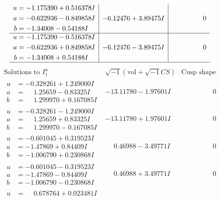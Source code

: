 \documentclass[1p]{elsarticle_modified}
\theoremstyle{definition}
\newcommand{\I}{\sqrt{-1}}
\begin{document}
$$\begin{array}{c|c|c}
\begin{aligned}
u &= -1.175390 + 0.516378 I \\
a &= -0.622936 - 0.849858 I \\
b &= -1.34008 - 0.54188 I\end{aligned}
 & -6.12476 + 3.89475 I & \phantom{-0.000000 } 0 \\ \hline\begin{aligned}
u &= -1.175390 - 0.516378 I \\
a &= -0.622936 + 0.849858 I \\
b &= -1.34008 + 0.54188 I\end{aligned}
 & -6.12476 - 3.89475 I & \phantom{-0.000000 } 0\\
 \hline 
 \end{array}$$\newpage$$\begin{array}{c|c|c}  
\text{Solutions to }I^u_{1}& \I (\text{vol} + \sqrt{-1}CS) & \text{Cusp shape}\\
 \hline 
\begin{aligned}
u &= -0.328261 + 1.249000 I \\
a &= \phantom{-}1.25659 - 0.83325 I \\
b &= \phantom{-}1.299970 + 0.167085 I\end{aligned}
 & -13.11780 - 1.97601 I & \phantom{-0.000000 } 0 \\ \hline\begin{aligned}
u &= -0.328261 - 1.249000 I \\
a &= \phantom{-}1.25659 + 0.83325 I \\
b &= \phantom{-}1.299970 - 0.167085 I\end{aligned}
 & -13.11780 + 1.97601 I & \phantom{-0.000000 } 0 \\ \hline\begin{aligned}
u &= -0.601045 + 0.319523 I \\
a &= -1.47869 + 0.84409 I \\
b &= -1.006790 + 0.230868 I\end{aligned}
 & \phantom{-}0.46988 - 3.49771 I & \phantom{-0.000000 } 0 \\ \hline\begin{aligned}
u &= -0.601045 - 0.319523 I \\
a &= -1.47869 - 0.84409 I \\
b &= -1.006790 - 0.230868 I\end{aligned}
 & \phantom{-}0.46988 + 3.49771 I & \phantom{-0.000000 } 0 \\ \hline\begin{aligned}
u &= \phantom{-}0.678764 + 0.023481 I \\

\end{aligned}
\end{array}$$
\end{document}
